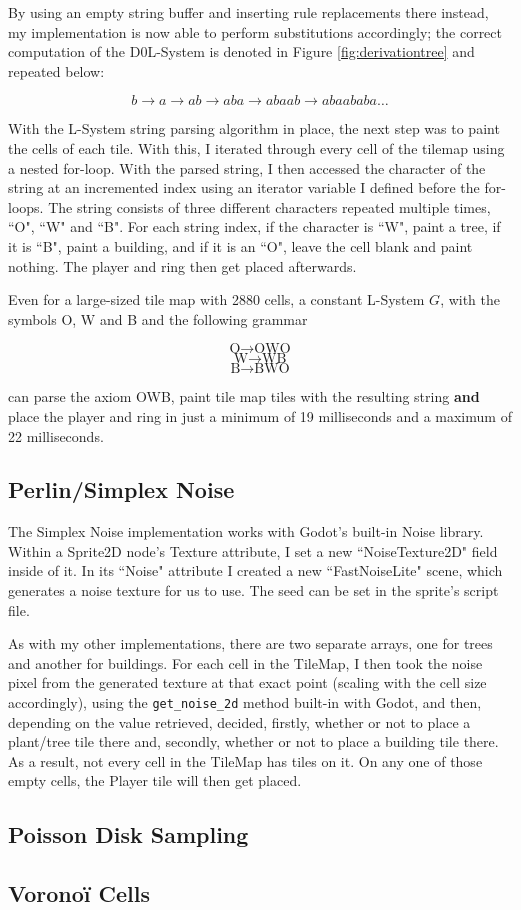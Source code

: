 By using an empty string buffer and inserting rule replacements there instead, my implementation is now able to perform substitutions accordingly; the correct computation of the D0L-System is denoted in Figure \ref{fig:derivationtree} and repeated below:

$$ b \rightarrow a \rightarrow ab \rightarrow aba \rightarrow abaab \rightarrow abaababa \ldots $$

With the L-System string parsing algorithm in place, the next step was to paint the cells of each tile. With this, I iterated through every cell of the tilemap using a nested for-loop. With the parsed string, I then accessed the character of the string at an incremented index using an iterator variable I defined before the for-loops. The string consists of three different characters repeated multiple times, ``O", ``W" and ``B". For each string index, if the character is ``W", paint a tree, if it is ``B", paint a building, and if it is an ``O", leave the cell blank and paint nothing. The player and ring then get placed afterwards.

Even for a large-sized tile map with 2880 cells, a constant L-System $G$, with the symbols O, W and B and the following grammar

$$ \mbox{O} \rightarrow \mbox{O}\mbox{W}\mbox{O} $$
$$ \mbox{W} \rightarrow \mbox{W}\mbox{B} $$
$$ \mbox{B} \rightarrow \mbox{B}\mbox{W}\mbox{O} $$

can parse the axiom OWB, paint tile map tiles with the resulting string \textbf{and} place the player and ring in just a minimum of 19 milliseconds and a maximum of 22 milliseconds.

\subsection{Perlin/Simplex Noise}

The Simplex Noise implementation works with Godot's built-in Noise library. Within a Sprite2D node's Texture attribute, I set a new ``NoiseTexture2D" field inside of it. In its ``Noise" attribute I created a new ``FastNoiseLite" scene, which generates a noise texture for us to use. The seed can be set in the sprite's script file.

As with my other implementations, there are two separate arrays, one for trees and another for buildings. For each cell in the TileMap, I then took the noise pixel from the generated texture at that exact point (scaling with the cell size accordingly), using the \verb|get_noise_2d| method built-in with Godot, and then, depending on the value retrieved, decided, firstly, whether or not to place a plant/tree tile there and, secondly, whether or not to place a building tile there. As a result, not every cell in the TileMap has tiles on it. On any one of those empty cells, the Player tile will then get placed.

\subsection{Poisson Disk Sampling}

\subsection{Voronoï Cells}